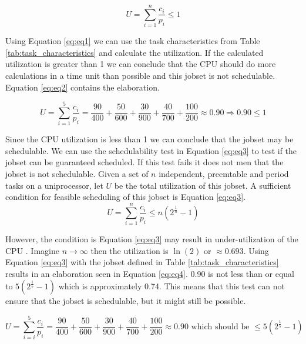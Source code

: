 \documentclass[10pt]{article}
\begin{document}
\begin{equation}
    U = \sum_{i=1}^{n} \frac{c_i}{p_i} \leq 1
    \label{eq:eq1}
\end{equation}

Using Equation \ref{eq:eq1} we can use the task characteristics from Table \ref{tab:task_characteristics} and calculate the utilization. If the calculated utilization is greater than 1 we can conclude that the CPU should do more calculations in a time unit than possible and this jobset is not schedulable.
Equation \ref{eq:eq2} contains the elaboration.

\begin{equation}
    U = \sum_{i=1}^{5} \frac{c_i}{p_i} = \frac{90}{400} + \frac{50}{600} + \frac{30}{900} + \frac{40}{700} + \frac{100}{200} \approx 0.90 \Rightarrow 0.90 \leq 1
    \label{eq:eq2}
\end{equation}

Since the CPU utilization is less than 1 we can conclude that the jobset may be schedulable.
We can use the schedulability test in Equation \ref{eq:eq3} to test if the jobset can be guaranteed scheduled.
If this test fails it does not men that the jobset is not schedulable.
Given a set of $n$ independent, preemtable and period tasks on a uniprocessor, let $U$ be the total utilization of this jobset.
A sufficient condition for feasible scheduling of this jobset is Equation \ref{eq:eq3}.
\begin{equation}
    U = \sum_{i=1}^{n} \frac{c_i}{p_i} \leq n(2^{\frac{1}{n}} - 1)
    \label{eq:eq3}
\end{equation}

However, the condition is Equation \ref{eq:eq3} may result in under-utilization of the CPU \cite{cheng}.
Imagine $n \rightarrow \infty$ then the utilization is $ \ln(2)$ or $\approx0.693$.
Using Equation \ref{eq:eq3} with the jobset defined in Table \ref{tab:task_characteristics} results in an elaboration seen in Equation \ref{eq:eq4}.
0.90 is not less than or equal to $5(2^{\frac{1}{5}} - 1)$ which is approximately 0.74.
This means that this test can not ensure that the jobset is schedulable, but it might still be possible.

\begin{equation}
    U = \sum_{i=i}^{5} \frac{c_i}{p_i} = \frac{90}{400} + \frac{50}{600} + \frac{30}{900} + \frac{40}{700} + \frac{100}{200} \approx 0.90 \text{  which should be } \leq  5(2^{\frac{1}{5}} - 1)  
    \label{eq:eq4}
\end{equation}
\end{document}
